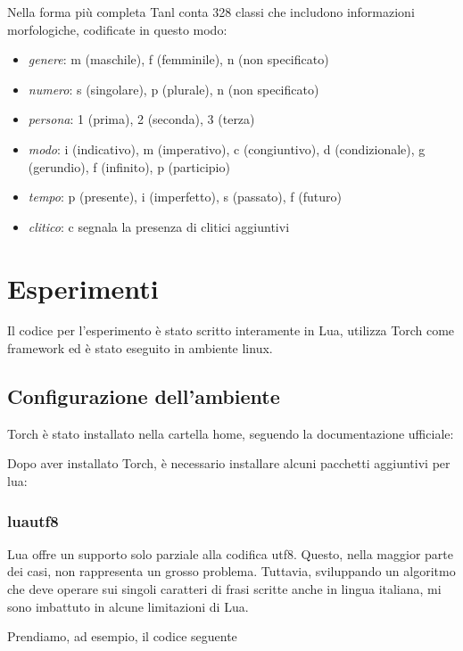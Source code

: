 Nella forma pi\`u completa Tanl conta 328 classi che includono informazioni morfologiche, codificate in questo modo:
\begin{itemize}
  \item \emph{genere}: m (maschile), f (femminile), n (non specificato)
  \item \emph{numero}: s (singolare), p (plurale), n (non specificato)
  \item \emph{persona}: 1 (prima), 2 (seconda), 3 (terza)
  \item \emph{modo}: i (indicativo), m (imperativo), c (congiuntivo), d (condizionale), g (gerundio), f (infinito), p (participio)
  \item \emph{tempo}: p (presente), i (imperfetto), s (passato), f (futuro)
  \item \emph{clitico}: c segnala la presenza di clitici aggiuntivi
\end{itemize}

\section{Esperimenti}

Il codice per l'esperimento \`e stato scritto interamente in Lua, utilizza Torch come framework ed \`e stato eseguito in ambiente linux.

\subsection{Configurazione dell'ambiente}
Torch \`e stato installato nella cartella home, seguendo la documentazione ufficiale:



Dopo aver installato Torch, \`e necessario installare alcuni pacchetti aggiuntivi per lua:



\subsubsection{luautf8}
Lua offre un supporto solo parziale alla codifica utf8.
Questo, nella maggior parte dei casi, non rappresenta un grosso problema.
Tuttavia, sviluppando un algoritmo che deve operare sui singoli caratteri di frasi scritte anche in lingua italiana, mi sono imbattuto in alcune limitazioni di Lua.

Prendiamo, ad esempio, il codice seguente

